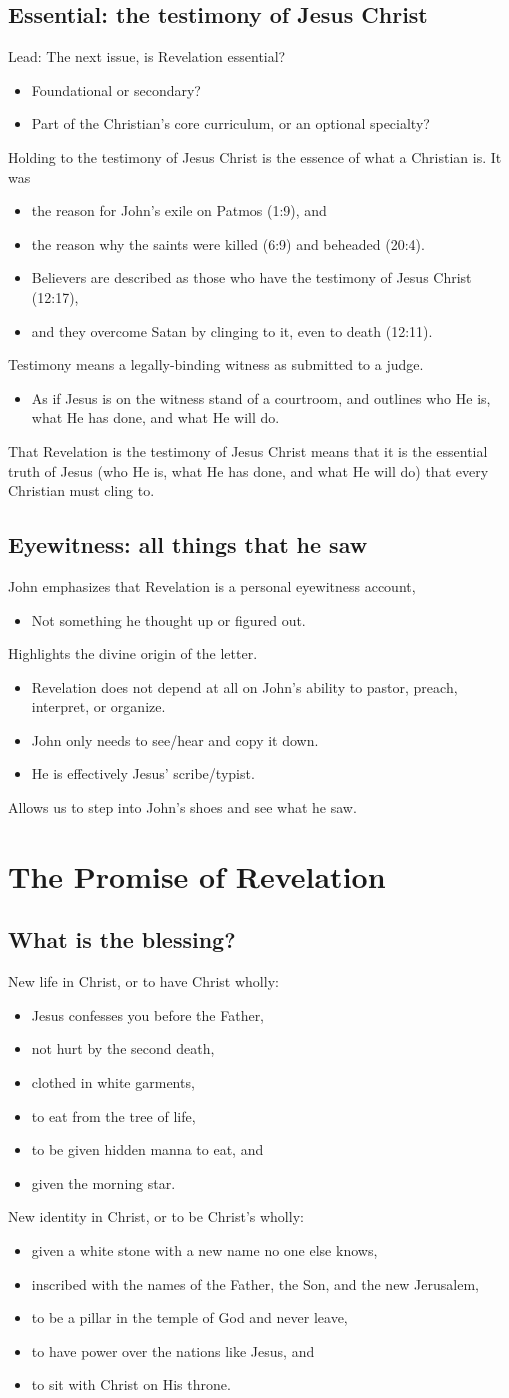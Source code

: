 \documentclass[12pt]{article}
\newcommand{\BI}{\begin{itemize}}
\newcommand{\EI}{\end{itemize}}
\newcommand{\I}{\item}
\begin{document}
\subsection{Essential: the testimony of Jesus Christ}
\I  Lead: The next issue, is Revelation essential?
\BI \I Foundational or secondary?
    \I Part of the Christian's core curriculum, or an optional specialty?
\EI
\I  Holding to the testimony of Jesus Christ is the essence of what a Christian is. It was 
\BI \I  the reason for John's exile on Patmos (1:9), and
    \I  the reason why the saints were killed (6:9) and beheaded (20:4).
    \I  Believers are described as those who have the testimony of Jesus Christ (12:17),
    \I  and they overcome Satan by clinging to it, even to death (12:11).
\EI
\I  Testimony means a legally-binding witness as submitted to a judge.
\BI \I  As if Jesus is on the witness stand of a courtroom, and outlines 
        who He is, what He has done, and what He will do. \EI
\I  That Revelation is the testimony of Jesus Christ means that it is the essential truth of Jesus 
    (who He is, what He has done, and what He will do)
    that every Christian must cling to.

\subsection{Eyewitness: all things that he saw}
\I  John emphasizes that Revelation is a personal eyewitness account,
\BI \I  Not something he thought up or figured out. \EI
\I  Highlights the divine origin of the letter.
\BI \I  Revelation does not depend at all on John's ability to pastor, preach, interpret, or organize.
    \I  John only needs to see/hear and copy it down.
    \I  He is effectively Jesus' scribe/typist.
\EI
\I  Allows us to step into John's shoes and see what he saw.

\section{The Promise of Revelation}
\subsection{What is the blessing?}
\I  New life in Christ, or to have Christ wholly:
\BI \I  Jesus confesses you before the Father,
    \I  not hurt by the second death,
    \I  clothed in white garments, 
    \I  to eat from the tree of life,
    \I  to be given hidden manna to eat, and
    \I  given the morning star. \EI
\I  New identity in Christ, or to be Christ's wholly:
\BI \I  given a white stone with a new name no one else knows,
    \I  inscribed with the names of the Father, the Son, and the new Jerusalem,
    \I  to be a pillar in the temple of God and never leave,
    \I  to have power over the nations like Jesus, and
    \I  to sit with Christ on His throne. \EI
\end{document}
